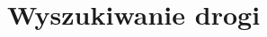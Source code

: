 \documentclass[../doc.tex]{subfiles}
\begin{document}
\section{Wyszukiwanie drogi}





\end{document}
